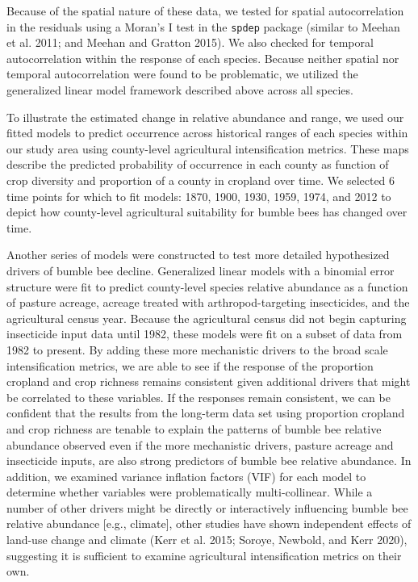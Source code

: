 \documentclass[11pt,]{article}
\begin{document}
Because of the spatial nature of these data, we tested for spatial
autocorrelation in the residuals using a Moran's I test in the
\texttt{spdep} package (similar to Meehan et al. 2011; and Meehan and
Gratton 2015). We also checked for temporal autocorrelation within the
response of each species. Because neither spatial nor temporal
autocorrelation were found to be problematic, we utilized the
generalized linear model framework described above across all species.

To illustrate the estimated change in relative abundance and range, we
used our fitted models to predict occurrence across historical ranges of
each species within our study area using county-level agricultural
intensification metrics. These maps describe the predicted probability
of occurrence in each county as function of crop diversity and
proportion of a county in cropland over time. We selected 6 time points
for which to fit models: 1870, 1900, 1930, 1959, 1974, and 2012 to
depict how county-level agricultural suitability for bumble bees has
changed over time.

Another series of models were constructed to test more detailed
hypothesized drivers of bumble bee decline. Generalized linear models
with a binomial error structure were fit to predict county-level species
relative abundance as a function of pasture acreage, acreage treated
with arthropod-targeting insecticides, and the agricultural census year.
Because the agricultural census did not begin capturing insecticide
input data until 1982, these models were fit on a subset of data from
1982 to present. By adding these more mechanistic drivers to the broad
scale intensification metrics, we are able to see if the response of the
proportion cropland and crop richness remains consistent given
additional drivers that might be correlated to these variables. If the
responses remain consistent, we can be confident that the results from
the long-term data set using proportion cropland and crop richness are
tenable to explain the patterns of bumble bee relative abundance
observed even if the more mechanistic drivers, pasture acreage and
insecticide inputs, are also strong predictors of bumble bee relative
abundance. In addition, we examined variance inflation factors (VIF) for
each model to determine whether variables were problematically
multi-collinear. While a number of other drivers might be directly or
interactively influencing bumble bee relative abundance {[}e.g.,
climate{]}, other studies have shown independent effects of land-use
change and climate (Kerr et al. 2015; Soroye, Newbold, and Kerr 2020),
suggesting it is sufficient to examine agricultural intensification
metrics on their own.
\end{document}
